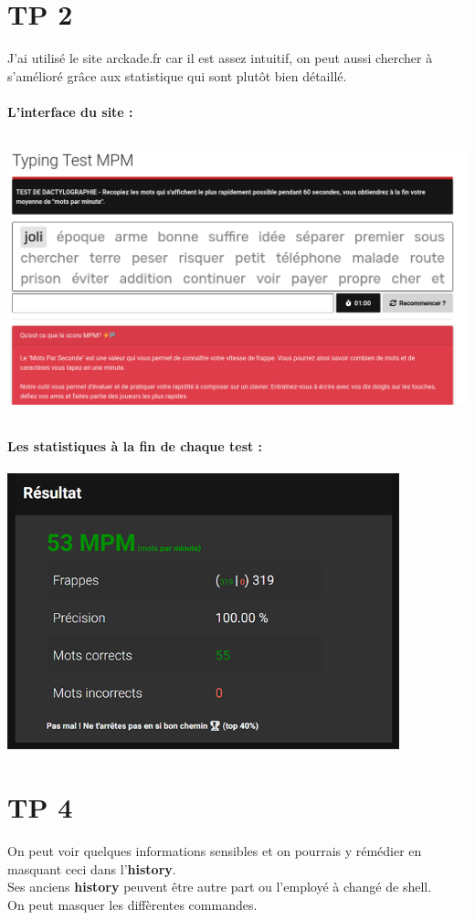 \documentclass{report}
\begin{document}
\section{TP 2}
J'ai utilisé le site arckade.fr car il est assez intuitif, on peut aussi
chercher à s'amélioré grâce aux statistique qui sont plutôt bien détaillé.
\\
\\
\newpage
\textbf{L'interface du site :}
\\
\\  
\includegraphics[height=8cm]{arckade}
\\
\\
\textbf{Les statistiques à la fin de chaque test :}
\\
\\ 
\includegraphics[height=8cm]{stats} 
\\
\newpage
\section{TP 4}
On peut voir quelques informations sensibles et on pourrais y rémédier en 
masquant ceci dans l'\textbf{history}.
\\
Ses anciens \textbf{history} peuvent être autre part ou l'employé à 
changé de shell. 
\\
On peut masquer les diffèrentes commandes.
\\
\end{document}
